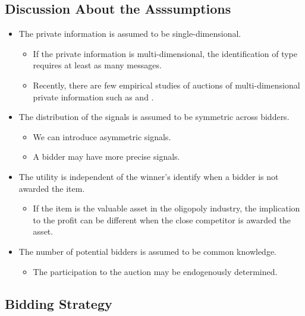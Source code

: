 \documentclass[
]{book}
\providecommand{\tightlist}{%
  \setlength{\itemsep}{0pt}\setlength{\parskip}{0pt}}
\begin{document}
\hypertarget{discussion-about-the-asssumptions}{%
\subsection{Discussion About the Asssumptions}\label{discussion-about-the-asssumptions}}

\begin{itemize}
\tightlist
\item
  The private information is assumed to be single-dimensional.

  \begin{itemize}
  \tightlist
  \item
    If the private information is multi-dimensional, the identification of type requires at least as many messages.
  \item
    Recently, there are few empirical studies of auctions of multi-dimensional private information such as \citet{bajariBiddingIncompleteContracts2014} and \citet{takahashiStrategicDesignUncertain2018}.
  \end{itemize}
\item
  The distribution of the signals is assumed to be symmetric across bidders.

  \begin{itemize}
  \tightlist
  \item
    We can introduce asymmetric signals.
  \item
    A bidder may have more precise signals.
  \end{itemize}
\item
  The utility is independent of the winner's identify when a bidder is not awarded the item.

  \begin{itemize}
  \tightlist
  \item
    If the item is the valuable asset in the oligopoly industry, the implication to the profit can be different when the close competitor is awarded the asset.
  \end{itemize}
\item
  The number of potential bidders is assumed to be common knowledge.

  \begin{itemize}
  \tightlist
  \item
    The participation to the auction may be endogenously determined.
  \end{itemize}
\end{itemize}

\hypertarget{bidding-strategy}{%
\subsection{Bidding Strategy}\label{bidding-strategy}}
\end{document}
